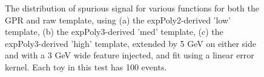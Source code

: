 \begin{figure} 
\begin{center}

\caption{The distribution of spurious signal for various functions for both the GPR and raw template, using (a) the expPoly2-derived 'low' template, (b) the expPoly3-derived 'med' template, (c) the expPoly3-derived 'high' template, extended by 5 GeV on either side and with a 3 GeV wide feature injected, and fit using a linear error kernel. Each toy in this test has 100 events.}
\label{fig:linearkernel_lowpt_100_Sig_1s}
\end{center}
\end{figure}


